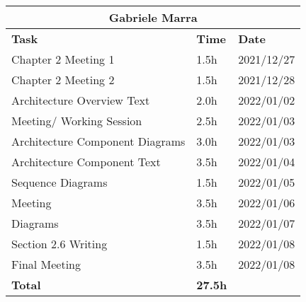 \begin{table}[H]
\centering
\begin{tabular}{|p{}|p{}|p{}|}
\hline
\multicolumn{3}{|c|}{\textbf{Gabriele Marra}}            \\ \hline
\textbf{Task}                   & \textbf{Time} & \textbf{Date} \\ \hline

Chapter 2 Meeting 1				&		1.5h	   &	2021/12/27 \\ \hline
Chapter 2 Meeting 2				&		1.5h	   &	2021/12/28 \\ \hline
Architecture Overview Text		&		2.0h	   &	2022/01/02 \\ \hline
Meeting/ Working Session		&		2.5h	   &	2022/01/03 \\ \hline
Architecture Component Diagrams	&		3.0h	   &	2022/01/03 \\ \hline
Architecture Component Text		&		3.5h	   &	2022/01/04 \\ \hline
Sequence Diagrams				&		1.5h	   &	2022/01/05 \\ \hline
Meeting							&		3.5h	   &	2022/01/06 \\ \hline
Diagrams						&		3.5h	   &	2022/01/07 \\ \hline
Section 2.6 Writing			 	&		1.5h	   &	2022/01/08 \\ \hline
Final Meeting					&		3.5h	   &	2022/01/08 \\ \hline
\textbf{Total}                  		&  \textbf{27.5h}   & \\ \hline
\end{tabular}
\end{table}
